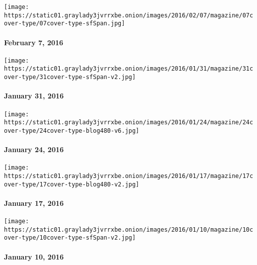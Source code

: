 \href{http://www.nytimes3xbfgragh.onion/indexes/2016/02/09/magazine/index.html}{}

\texttt{[image: https://static01.graylady3jvrrxbe.onion/images/2016/02/07/magazine/07cover-type/07cover-type-sfSpan.jpg]}

\hypertarget{february-7-2016}{%
\paragraph{February 7, 2016}\label{february-7-2016}}

\href{http://www.nytimes3xbfgragh.onion/indexes/2016/01/31/magazine/index.html}{}

\texttt{[image: https://static01.graylady3jvrrxbe.onion/images/2016/01/31/magazine/31cover-type/31cover-type-sfSpan-v2.jpg]}

\hypertarget{january-31-2016}{%
\paragraph{January 31, 2016}\label{january-31-2016}}

\href{http://www.nytimes3xbfgragh.onion/indexes/2016/01/24/magazine/index.html}{}

\texttt{[image: https://static01.graylady3jvrrxbe.onion/images/2016/01/24/magazine/24cover-type/24cover-type-blog480-v6.jpg]}

\hypertarget{january-24-2016}{%
\paragraph{January 24, 2016}\label{january-24-2016}}

\href{http://www.nytimes3xbfgragh.onion/indexes/2016/01/17/magazine/index.html}{}

\texttt{[image: https://static01.graylady3jvrrxbe.onion/images/2016/01/17/magazine/17cover-type/17cover-type-blog480-v2.jpg]}

\hypertarget{january-17-2016}{%
\paragraph{January 17, 2016}\label{january-17-2016}}

\href{http://www.nytimes3xbfgragh.onion/indexes/2016/01/10/magazine/index.html}{}

\texttt{[image: https://static01.graylady3jvrrxbe.onion/images/2016/01/10/magazine/10cover-type/10cover-type-sfSpan-v2.jpg]}

\hypertarget{january-10-2016}{%
\paragraph{January 10, 2016}\label{january-10-2016}}

